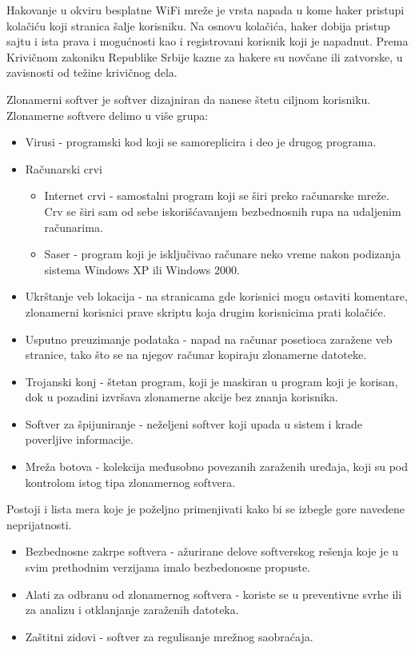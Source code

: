 \documentclass[12pt]{article}
\begin{document}
Hakovanje u okviru besplatne WiFi mreže je vrsta napada u kome haker pristupi kolačiću koji stranica šalje korisniku. Na osnovu kolačića, haker dobija pristup sajtu i ista prava i mogućnosti kao i registrovani korisnik koji je napadnut. Prema Krivičnom zakoniku Republike Srbije kazne za hakere su novčane ili zatvorske, u zavisnosti od težine krivičnog dela.

Zlonamerni softver je softver dizajniran da nanese štetu ciljnom korisniku. Zlonamerne softvere delimo u više grupa:
\begin{itemize}
    \item Virusi - programski kod koji se samoreplicira i deo je drugog programa.
    \item Računarski crvi
        \begin{itemize}
            \item Internet crvi - samostalni program koji se širi preko računarske mreže. Crv se širi sam od sebe iskorišćavanjem bezbednosnih rupa na udaljenim računarima.
            \item Saser - program koji je isključivao računare neko vreme nakon podizanja sistema Windows XP ili Windows 2000.
        \end{itemize}
    \item Ukrštanje veb lokacija - na stranicama gde korisnici mogu ostaviti komentare, zlonamerni korisnici prave skriptu koja drugim korisnicima prati kolačiće.
    \item Usputno preuzimanje podataka - napad na računar posetioca zaražene veb stranice, tako što se na njegov računar kopiraju zlonamerne datoteke.
    \item Trojanski konj - štetan program, koji je maskiran u program koji je korisan, dok u pozadini izvršava zlonamerne akcije bez znanja korisnika.
    \item Softver za špijuniranje - neželjeni softver koji upada u sistem i krade poverljive informacije.
    \item Mreža botova - kolekcija međusobno povezanih zaraženih uređaja, koji su pod kontrolom istog tipa zlonamernog softvera.
\end{itemize}

Postoji i lista mera koje je poželjno primenjivati kako bi se izbegle gore navedene neprijatnosti. 
\begin{itemize}
    \item Bezbednosne zakrpe softvera - ažurirane delove softverskog rešenja koje je u svim prethodnim verzijama imalo bezbedonosne propuste.
    \item Alati za odbranu od zlonamernog softvera - koriste se u preventivne svrhe ili za analizu i otklanjanje zaraženih datoteka.
    \item Zaštitni zidovi - softver za regulisanje mrežnog saobraćaja.
\end{itemize}
\end{document}
